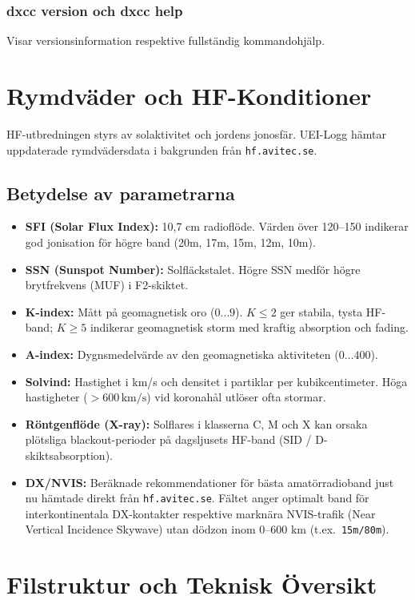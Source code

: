 \documentclass[11pt,a4paper]{article}
\begin{document}
\subsubsection{dxcc version och dxcc help}
Visar versionsinformation respektive fullständig kommandohjälp.

\section{Rymdväder och HF-Konditioner}
\label{sec:spaceweather}

HF-utbredningen styrs av solaktivitet och jordens jonosfär. UEI-Logg hämtar uppdaterade rymdvädersdata i bakgrunden från \texttt{hf.avitec.se}.

\subsection{Betydelse av parametrarna}
\begin{itemize}
    \item \textbf{SFI (Solar Flux Index):} 10,7 cm radioflöde. Värden över 120--150 indikerar god jonisation för högre band (20m, 17m, 15m, 12m, 10m).
    \item \textbf{SSN (Sunspot Number):} Solfläckstalet. Högre SSN medför högre brytfrekvens (MUF) i F2-skiktet.
    \item \textbf{K-index:} Mått på geomagnetisk oro ($0\dots 9$). $K \le 2$ ger stabila, tysta HF-band; $K \ge 5$ indikerar geomagnetisk storm med kraftig absorption och fading.
    \item \textbf{A-index:} Dygnsmedelvärde av den geomagnetiska aktiviteten ($0\dots 400$).
    \item \textbf{Solvind:} Hastighet i km/s och densitet i partiklar per kubikcentimeter. Höga hastigheter ($>600\,\text{km/s}$) vid koronahål utlöser ofta stormar.
    \item \textbf{Röntgenflöde (X-ray):} Solflares i klasserna C, M och X kan orsaka plötsliga blackout-perioder på dagsljusets HF-band (SID / D-skiktsabsorption).
    \item \textbf{DX/NVIS:} Beräknade rekommendationer för bästa amatörradioband just nu hämtade direkt från \texttt{hf.avitec.se}. Fältet anger optimalt band för interkontinentala DX-kontakter respektive marknära NVIS-trafik (Near Vertical Incidence Skywave) utan dödzon inom 0--600 km (t.ex.\ \texttt{15m/80m}).
\end{itemize}

\section{Filstruktur och Teknisk Översikt}
\label{sec:tech}
\end{document}
